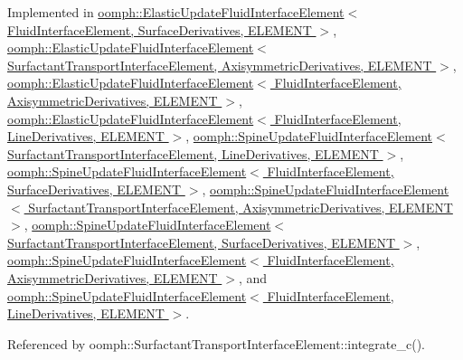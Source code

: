 Implemented in \hyperlink{classoomph_1_1ElasticUpdateFluidInterfaceElement_ae9df6c11ccb63dc04c0d5ca655fe1482}{oomph\+::\+Elastic\+Update\+Fluid\+Interface\+Element$<$ Fluid\+Interface\+Element, Surface\+Derivatives, E\+L\+E\+M\+E\+N\+T $>$}, \hyperlink{classoomph_1_1ElasticUpdateFluidInterfaceElement_ae9df6c11ccb63dc04c0d5ca655fe1482}{oomph\+::\+Elastic\+Update\+Fluid\+Interface\+Element$<$ Surfactant\+Transport\+Interface\+Element, Axisymmetric\+Derivatives, E\+L\+E\+M\+E\+N\+T $>$}, \hyperlink{classoomph_1_1ElasticUpdateFluidInterfaceElement_ae9df6c11ccb63dc04c0d5ca655fe1482}{oomph\+::\+Elastic\+Update\+Fluid\+Interface\+Element$<$ Fluid\+Interface\+Element, Axisymmetric\+Derivatives, E\+L\+E\+M\+E\+N\+T $>$}, \hyperlink{classoomph_1_1ElasticUpdateFluidInterfaceElement_ae9df6c11ccb63dc04c0d5ca655fe1482}{oomph\+::\+Elastic\+Update\+Fluid\+Interface\+Element$<$ Fluid\+Interface\+Element, Line\+Derivatives, E\+L\+E\+M\+E\+N\+T $>$}, \hyperlink{classoomph_1_1SpineUpdateFluidInterfaceElement_a75debcd348674d5ea58bfefc0e72b737}{oomph\+::\+Spine\+Update\+Fluid\+Interface\+Element$<$ Surfactant\+Transport\+Interface\+Element, Line\+Derivatives, E\+L\+E\+M\+E\+N\+T $>$}, \hyperlink{classoomph_1_1SpineUpdateFluidInterfaceElement_a75debcd348674d5ea58bfefc0e72b737}{oomph\+::\+Spine\+Update\+Fluid\+Interface\+Element$<$ Fluid\+Interface\+Element, Surface\+Derivatives, E\+L\+E\+M\+E\+N\+T $>$}, \hyperlink{classoomph_1_1SpineUpdateFluidInterfaceElement_a75debcd348674d5ea58bfefc0e72b737}{oomph\+::\+Spine\+Update\+Fluid\+Interface\+Element$<$ Surfactant\+Transport\+Interface\+Element, Axisymmetric\+Derivatives, E\+L\+E\+M\+E\+N\+T $>$}, \hyperlink{classoomph_1_1SpineUpdateFluidInterfaceElement_a75debcd348674d5ea58bfefc0e72b737}{oomph\+::\+Spine\+Update\+Fluid\+Interface\+Element$<$ Surfactant\+Transport\+Interface\+Element, Surface\+Derivatives, E\+L\+E\+M\+E\+N\+T $>$}, \hyperlink{classoomph_1_1SpineUpdateFluidInterfaceElement_a75debcd348674d5ea58bfefc0e72b737}{oomph\+::\+Spine\+Update\+Fluid\+Interface\+Element$<$ Fluid\+Interface\+Element, Axisymmetric\+Derivatives, E\+L\+E\+M\+E\+N\+T $>$}, and \hyperlink{classoomph_1_1SpineUpdateFluidInterfaceElement_a75debcd348674d5ea58bfefc0e72b737}{oomph\+::\+Spine\+Update\+Fluid\+Interface\+Element$<$ Fluid\+Interface\+Element, Line\+Derivatives, E\+L\+E\+M\+E\+N\+T $>$}.



Referenced by oomph\+::\+Surfactant\+Transport\+Interface\+Element\+::integrate\+\_\+c().

\mbox{\label{classoomph_1_1FluidInterfaceElement_a3f66ffd5d9a8b9b6bd8cd54e90ce2d61}} 
